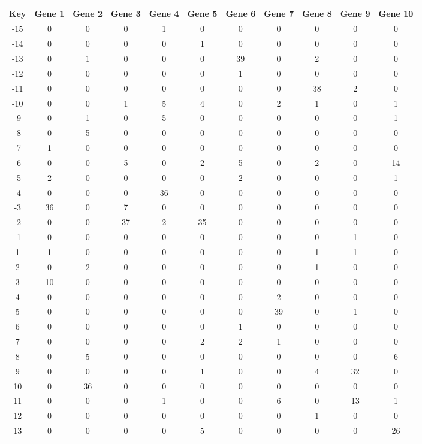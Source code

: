 \begin{tabular}{|c|c|c|c|c|c|c|c|c|c|c|}
\hline
Key & Gene 1 & Gene 2 & Gene 3 & Gene 4 & Gene 5 & Gene 6 & Gene 7 & Gene 8 & Gene 9 & Gene 10 \\
\hline
-15 & 0 & 0 & 0 & 1 & 0 & 0 & 0 & 0 & 0 & 0 \\
-14 & 0 & 0 & 0 & 0 & 1 & 0 & 0 & 0 & 0 & 0 \\
-13 & 0 & 1 & 0 & 0 & 0 & 39 & 0 & 2 & 0 & 0 \\
-12 & 0 & 0 & 0 & 0 & 0 & 1 & 0 & 0 & 0 & 0 \\
-11 & 0 & 0 & 0 & 0 & 0 & 0 & 0 & 38 & 2 & 0 \\
-10 & 0 & 0 & 1 & 5 & 4 & 0 & 2 & 1 & 0 & 1 \\
-9 & 0 & 1 & 0 & 5 & 0 & 0 & 0 & 0 & 0 & 1 \\
-8 & 0 & 5 & 0 & 0 & 0 & 0 & 0 & 0 & 0 & 0 \\
-7 & 1 & 0 & 0 & 0 & 0 & 0 & 0 & 0 & 0 & 0 \\
-6 & 0 & 0 & 5 & 0 & 2 & 5 & 0 & 2 & 0 & 14 \\
-5 & 2 & 0 & 0 & 0 & 0 & 2 & 0 & 0 & 0 & 1 \\
-4 & 0 & 0 & 0 & 36 & 0 & 0 & 0 & 0 & 0 & 0 \\
-3 & 36 & 0 & 7 & 0 & 0 & 0 & 0 & 0 & 0 & 0 \\
-2 & 0 & 0 & 37 & 2 & 35 & 0 & 0 & 0 & 0 & 0 \\
-1 & 0 & 0 & 0 & 0 & 0 & 0 & 0 & 0 & 1 & 0 \\
1 & 1 & 0 & 0 & 0 & 0 & 0 & 0 & 1 & 1 & 0 \\
2 & 0 & 2 & 0 & 0 & 0 & 0 & 0 & 1 & 0 & 0 \\
3 & 10 & 0 & 0 & 0 & 0 & 0 & 0 & 0 & 0 & 0 \\
4 & 0 & 0 & 0 & 0 & 0 & 0 & 2 & 0 & 0 & 0 \\
5 & 0 & 0 & 0 & 0 & 0 & 0 & 39 & 0 & 1 & 0 \\
6 & 0 & 0 & 0 & 0 & 0 & 1 & 0 & 0 & 0 & 0 \\
7 & 0 & 0 & 0 & 0 & 2 & 2 & 1 & 0 & 0 & 0 \\
8 & 0 & 5 & 0 & 0 & 0 & 0 & 0 & 0 & 0 & 6 \\
9 & 0 & 0 & 0 & 0 & 1 & 0 & 0 & 4 & 32 & 0 \\
10 & 0 & 36 & 0 & 0 & 0 & 0 & 0 & 0 & 0 & 0 \\
11 & 0 & 0 & 0 & 1 & 0 & 0 & 6 & 0 & 13 & 1 \\
12 & 0 & 0 & 0 & 0 & 0 & 0 & 0 & 1 & 0 & 0 \\
13 & 0 & 0 & 0 & 0 & 5 & 0 & 0 & 0 & 0 & 26 \\
\hline
\end{tabular}